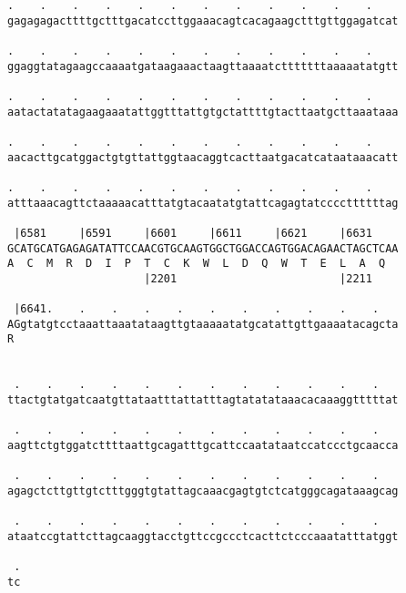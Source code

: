 \documentclass{article}
\begin{document}
\begin{Verbatim}
.    .    .    .    .    .    .    .    .    .    .    .    
gagagagacttttgctttgacatccttggaaacagtcacagaagctttgttggagatcat
                                                            
.    .    .    .    .    .    .    .    .    .    .    .    
ggaggtatagaagccaaaatgataagaaactaagttaaaatctttttttaaaaatatgtt
                                                            
.    .    .    .    .    .    .    .    .    .    .    .    
aatactatatagaagaaatattggtttattgtgctattttgtacttaatgcttaaataaa
                                                            
.    .    .    .    .    .    .    .    .    .    .    .    
aacacttgcatggactgtgttattggtaacaggtcacttaatgacatcataataaacatt
                                                            
.    .    .    .    .    .    .    .    .    .    .    .    
atttaaacagttctaaaaacatttatgtacaatatgtattcagagtatccccttttttag
                                                            
 |6581     |6591     |6601     |6611     |6621     |6631    
GCATGCATGAGAGATATTCCAACGTGCAAGTGGCTGGACCAGTGGACAGAACTAGCTCAA
A  C  M  R  D  I  P  T  C  K  W  L  D  Q  W  T  E  L  A  Q  
                     |2201                         |2211    
  
 |6641.    .    .    .    .    .    .    .    .    .    .   
AGgtatgtcctaaattaaatataagttgtaaaaatatgcatattgttgaaaatacagcta
R                                                           
                                                            
  
 .    .    .    .    .    .    .    .    .    .    .    .   
ttactgtatgatcaatgttataatttattatttagtatatataaacacaaaggtttttat
                                                            
 .    .    .    .    .    .    .    .    .    .    .    .   
aagttctgtggatcttttaattgcagatttgcattccaatataatccatccctgcaacca
                                                            
 .    .    .    .    .    .    .    .    .    .    .    .   
agagctcttgttgtctttgggtgtattagcaaacgagtgtctcatgggcagataaagcag
                                                            
 .    .    .    .    .    .    .    .    .    .    .    .   
ataatccgtattcttagcaaggtacctgttccgccctcacttctcccaaatatttatggt
                                                            
 .
tc
  

\end{Verbatim}
\end{document}
